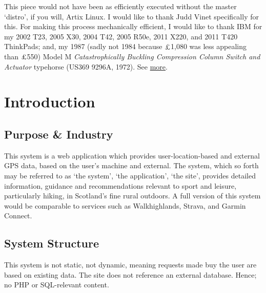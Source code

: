 \documentclass[11pt, english]{article}
\begin{document}
	This piece would not have been as efficiently executed without the master `distro’, if you will, Artix Linux. I would like to thank Judd Vinet specifically for this. For making this process mechanically efficient, I would like to thank IBM for my 2002 T23, 2005 X30, 2004 T42, 2005 R50e, 2011 X220, and 2011 T420 ThinkPads; and, my 1987 (sadly not 1984 because $\textrm{\pounds}$1,080 was less appealing than $\textrm{\pounds}$550) Model M \textit{Catastrophically Buckling Compression Column Switch and Actuator} typehorse (US369 9296A, 1972). See \href{http://lewisbritton.com/Blog/ThinkFlow.html}{more}. 

\newpage

	\renewcommand{\contentsname}{Table of Contents}

	\tableofcontents

\newpage

	\listoftables

\newpage

	\listoffigures

\newpage


\section{Introduction}\label{ch1}

	\subsection{Purpose \& Industry}

	This system is a web application which provides user-location-based and external GPS data, based on the user's machine and external. The system, which so forth may be referred to as `the system', `the application', `the site', provides detailed information, guidance and recommendations relevant to sport and leisure, particularly hiking, in Scotland's fine rural outdoors. A full version of this system would be comparable to services such as Walkhighlands, Strava, and Garmin Connect.

	\subsection{System Structure}

	This system is not static, not dynamic, meaning requests made buy the user are based on existing data. The site does not reference an external database. Hence; no PHP or SQL-relevant content.\\
\end{document}

